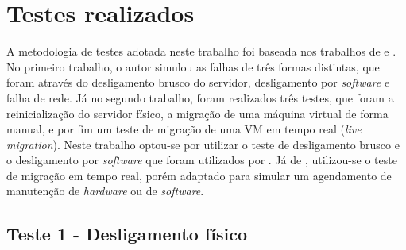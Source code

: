 
\newpage
\section{Testes realizados}

A metodologia de testes adotada neste trabalho foi baseada nos trabalhos de \citet{reis2009} e \citet{goncalves2009}. No primeiro trabalho, 
o autor simulou as falhas de três formas distintas, que foram através do desligamento brusco do servidor, desligamento por \textit{software} e 
falha de rede. Já no segundo trabalho, foram realizados três testes, que foram a reinicialização do servidor físico, a migração de uma 
máquina virtual de forma manual, e por fim um teste de migração de uma \ac{VM} em tempo real (\textit{live migration}).
Neste trabalho optou-se por utilizar o teste de desligamento brusco e o desligamento por \textit{software} que foram utilizados por 
\citet{reis2009}. Já de \citet{goncalves2009}, utilizou-se o teste de migração em tempo real, porém adaptado para simular um agendamento de 
manutenção de \textit{hardware} ou de \textit{software}.


\subsection{Teste 1 - Desligamento físico}

